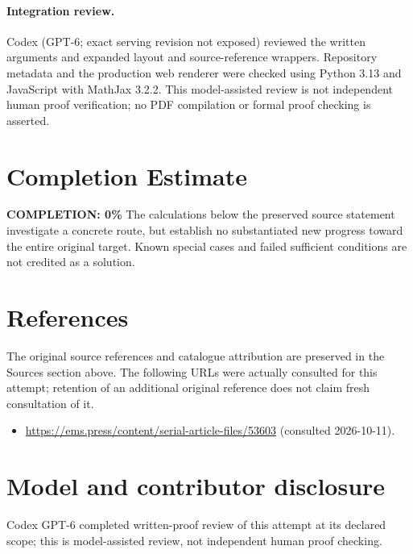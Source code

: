 \documentclass[11pt]{article}
\begin{document}
\paragraph{Integration review.} Codex (GPT-6; exact serving revision not exposed) reviewed the written arguments and expanded layout and source-reference wrappers. Repository metadata and the production web renderer were checked using Python 3.13 and JavaScript with MathJax 3.2.2. This model-assisted review is not independent human proof verification; no PDF compilation or formal proof checking is asserted.

\section{Completion Estimate}
\noindent\textbf{COMPLETION: 0\%}
The calculations below the preserved source statement investigate a concrete route,
but establish no substantiated new progress toward the entire original target.
Known special cases and failed sufficient conditions are not credited as a solution.
\section{References}
The original source references and catalogue attribution are preserved in the
Sources section above. The following URLs were actually consulted for this attempt;
retention of an additional original reference does not claim fresh consultation of it.
\begin{itemize}
\item \url{https://ems.press/content/serial-article-files/53603} (consulted 2026-10-11). 
\end{itemize}
\section{Model and contributor disclosure}
Codex GPT-6 completed written-proof review of this attempt at its declared scope; this is model-assisted review, not independent human proof checking.
\end{document}
